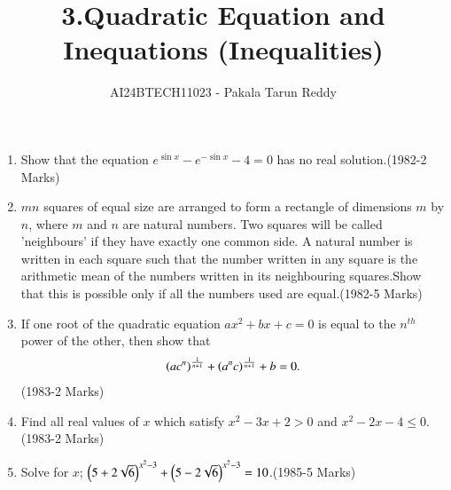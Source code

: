 \documentclass[journal,12pt,twocolumn]{IEEEtran}
\theoremstyle{remark}
\begin{document}

\onecolumn
\vspace{3cm}

\title{3.Quadratic Equation and\\ Inequations (Inequalities)}
\author{AI24BTECH11023 - Pakala Tarun Reddy}
\maketitle
\begin{enumerate}[start=13]
\item Show that the equation $e^{\sin{x}}-e^{-\sin{x}}-4=0$ has no real solution.\hfill{(1982-2 Marks)}
\item $mn$ squares of equal size are arranged to form a rectangle of dimensions $m$ by $n$, where $m$ and $n$ are natural numbers. Two squares will be called 'neighbours' if they have exactly one common side. A natural number is written in each square such that the number written in any square is the arithmetic mean of the numbers written in its neighbouring squares.Show that this is possible only if all the numbers used are equal.\hfill{(1982-5 Marks)}
\item {If one root of the quadratic equation $ax^2+bx+c=0$ is equal to the $n^{th}$ power of the other, then show that\begin{align*}
\left(ac^n\right)^\frac{1}{n+1} +\left(a^nc\right)^\frac{1}{n+1}+b=0. \end{align*} \hfill(1983-2 Marks)}
 \item {Find all real values of $x$ which satisfy $x^2-3x+2>0$ and $x^2-2x-4\leq 0$.\hfill{(1983-2 Marks)}}
 \item Solve for $x$; $\left(5+2\sqrt{6}\right)^{x^2-3}+\left(5-2\sqrt{6}\right)^{x^2-3}=10$.\hfill{(1985-5 Marks)}
 

\end{enumerate}
\end{document}
